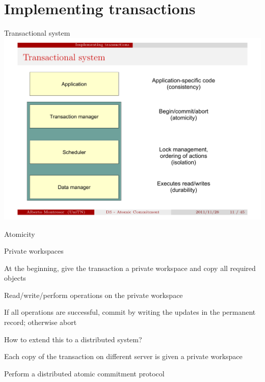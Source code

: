\section{Implementing transactions}

\begin{frame}{Transactional system}
\includegraphics[width=\textwidth]{fig2-transactional.pdf}
\end{frame}

\begin{frame}{Atomicity}
	
\BI
\item \alert{Private workspaces}
  \BI
  \item At the beginning, give the transaction a private workspace and copy all required objects
  \item Read/write/perform operations on the private workspace
  \item If all operations are successful, commit by writing the updates in the permanent record; otherwise abort
  \EI
\item How to extend this to a distributed system?
  \BI
  \item Each copy of the transaction on different server is given a private workspace
  \item Perform a distributed \alert{atomic commitment protocol}
  \EI
\EI

\end{frame}

